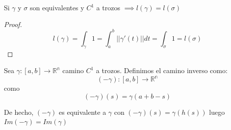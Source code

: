 \begin{corolario}
    Si $\gamma$ y $\sigma$ son equivalentes y $C^1$ a trozos $\implies l(\gamma)=l(\sigma)$
\end{corolario}

\begin{proof}
    $$l(\gamma) =\int_{\gamma}1=\int_{a}^{b}||\gamma'(t)||dt=\int_{\sigma}1=l(\sigma)$$
\end{proof}

\begin{definición}
    Sea $\gamma:[a,b] \to \mathbb{R^n}$ camino $C^1$ a trozos. Definimos el camino inverso como: \\
    $$(-\gamma):[a,b] \to \mathbb{R^n}$$ como $$ (-\gamma)(s)=\gamma(a+b-s)$$
\end{definición}

\begin{observación}
    De hecho, $(-\gamma)$ es equivalente a $\gamma$ con $(-\gamma)(s)=\gamma(h(s))$ luego $Im(-\gamma)=Im(\gamma)$
\end{observación}

